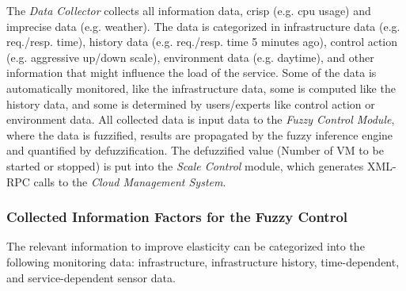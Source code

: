 The \textit{Data Collector} collects all information data, crisp (e.g. cpu usage) and imprecise data (e.g. weather). The data is categorized in infrastructure data (e.g. req./resp. time), history data (e.g. req./resp. time 5 minutes ago), control action (e.g. aggressive up/down scale), environment data (e.g. daytime), and other information that might influence the load of the service.  Some of the data is automatically monitored, like the infrastructure data, some is computed like the history data, and some is determined by users/experts like control action or environment data. 
All collected data is input data to the \textit{Fuzzy Control Module}, where the data is fuzzified, results are propagated by the fuzzy inference engine and quantified by defuzzification. The defuzzified value (Number of VM to be started or stopped) is put into the \textit{Scale Control} module, which generates XML-RPC calls to the \textit{Cloud Management System}.

\subsubsection{Collected Information Factors for the Fuzzy Control}\label{fuzzyParameters}
The relevant information to improve elasticity can be categorized into the following monitoring data: infrastructure, infrastructure history, time-dependent, and service-dependent sensor data. %


